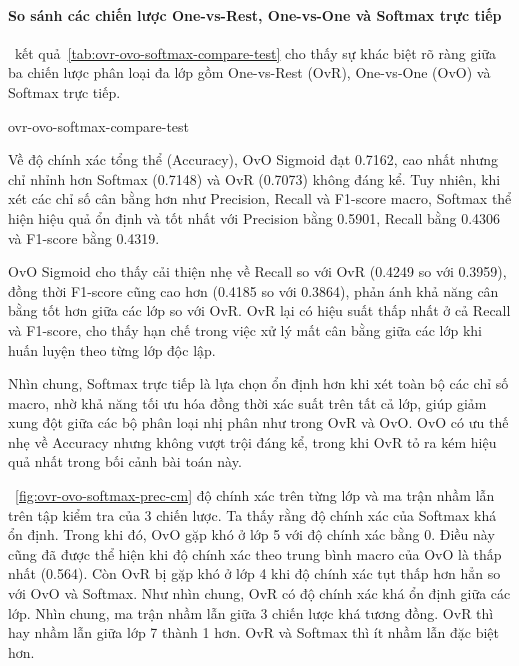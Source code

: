 \paragraph{So sánh các chiến lược One-vs-Rest, One-vs-One và Softmax trực tiếp}

\tablename~kết quả~\ref{tab:ovr-ovo-softmax-compare-test} cho thấy sự khác biệt
rõ ràng giữa ba chiến lược phân loại đa lớp gồm One-vs-Rest (OvR), One-vs-One
(OvO) và Softmax trực tiếp.

\begin{table}[htbp]
  \centering
  \caption{Các chỉ số đánh giá của 3 chiến lược One-vs-Rest, One-vs-One và
  softmax trực tiếp trên tập kiểm tra của bộ dữ liệu Forest CoverType}
  \label{tab:ovr-ovo-softmax-compare-test}
  {ovr-ovo-softmax-compare-test}

\end{table}

Về độ chính xác tổng thể (Accuracy), OvO Sigmoid đạt 0.7162, cao nhất nhưng chỉ
nhỉnh hơn Softmax (0.7148) và OvR (0.7073) không đáng kể. Tuy nhiên, khi xét
các chỉ số cân bằng hơn như Precision, Recall và F1-score macro, Softmax thể
hiện hiệu quả ổn định và tốt nhất với Precision bằng 0.5901, Recall bằng 0.4306
và F1-score bằng 0.4319.

OvO Sigmoid cho thấy cải thiện nhẹ về Recall so với OvR (0.4249 so với 0.3959),
đồng thời F1-score cũng cao hơn (0.4185 so với 0.3864), phản ánh khả năng cân
bằng tốt hơn giữa các lớp so với OvR. OvR lại có hiệu suất thấp nhất ở cả
Recall và F1-score, cho thấy hạn chế trong việc xử lý mất cân bằng giữa các lớp
khi huấn luyện theo từng lớp độc lập.

Nhìn chung, Softmax trực tiếp là lựa chọn ổn định hơn khi xét toàn bộ các chỉ
số macro, nhờ khả năng tối ưu hóa đồng thời xác suất trên tất cả lớp, giúp giảm
xung đột giữa các bộ phân loại nhị phân như trong OvR và OvO. OvO có ưu thế nhẹ
về Accuracy nhưng không vượt trội đáng kể, trong khi OvR tỏ ra kém hiệu quả
nhất trong bối cảnh bài toán này.

\figurename~\ref{fig:ovr-ovo-softmax-prec-cm} độ chính xác trên từng lớp và ma
trận nhầm lẫn trên tập kiểm tra của 3 chiến lược. Ta thấy rằng độ chính xác của
Softmax khá ổn định. Trong khi đó, OvO gặp khó ở lớp 5 với độ chính xác
bằng 0. Điều này cũng đã được thể hiện khi độ chính xác theo trung bình macro
của OvO là thấp nhất (0.564). Còn OvR bị gặp khó ở lớp 4 khi độ chính xác tụt
thấp hơn hẳn so với OvO và Softmax. Như nhìn chung, OvR có độ chính xác khá ổn
định giữa các lớp. Nhìn chung, ma trận nhầm lẫn giữa 3 chiến lược khá tương
đồng. OvR thì hay nhầm lẫn giữa lớp 7 thành 1 hơn. OvR và Softmax thì ít nhầm
lẫn đặc biệt hơn.


